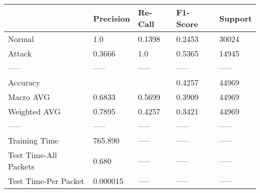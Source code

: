 \begin{tabular}{lllll}
\toprule
{} & Precision & Re-Call & F1-Score & Support \\
\midrule
Normal                &       1.0 &  0.1398 &   0.2453 &   30024 \\
Attack                &    0.3666 &     1.0 &   0.5365 &   14945 \\
-----                 &     ----- &   ----- &    ----- &   ----- \\
Accuracy              &           &         &   0.4257 &   44969 \\
Macro AVG             &    0.6833 &  0.5699 &   0.3909 &   44969 \\
Weighted AVG          &    0.7895 &  0.4257 &   0.3421 &   44969 \\
-----                 &     ----- &   ----- &    ----- &   ----- \\
Training Time         &   765.890 &   ----- &    ----- &   ----- \\
Test Time-All Packets &     0.680 &   ----- &    ----- &   ----- \\
Test Time-Per Packet  &  0.000015 &   ----- &    ----- &   ----- \\
\bottomrule
\end{tabular}
